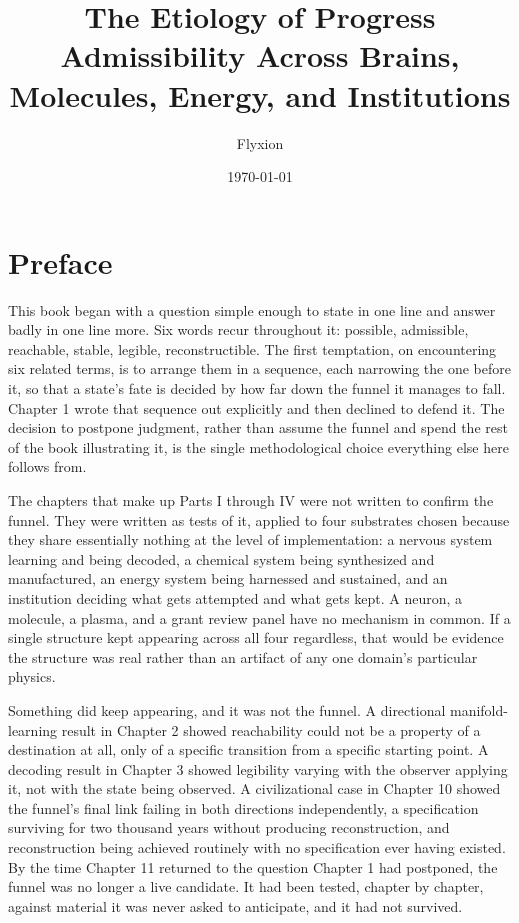 \documentclass[11pt]{book}
\title{The Etiology of Progress\\[0.3em]\large Admissibility Across Brains, Molecules, Energy, and Institutions}
\author{Flyxion}
\date{\today}
\begin{document}
\maketitle

\tableofcontents

\chapter*{Preface}

This book began with a question simple enough to state in one line and answer badly in one line more. Six words recur throughout it: possible, admissible, reachable, stable, legible, reconstructible. The first temptation, on encountering six related terms, is to arrange them in a sequence, each narrowing the one before it, so that a state's fate is decided by how far down the funnel it manages to fall. Chapter 1 wrote that sequence out explicitly and then declined to defend it. The decision to postpone judgment, rather than assume the funnel and spend the rest of the book illustrating it, is the single methodological choice everything else here follows from.

The chapters that make up Parts I through IV were not written to confirm the funnel. They were written as tests of it, applied to four substrates chosen because they share essentially nothing at the level of implementation: a nervous system learning and being decoded, a chemical system being synthesized and manufactured, an energy system being harnessed and sustained, and an institution deciding what gets attempted and what gets kept. A neuron, a molecule, a plasma, and a grant review panel have no mechanism in common. If a single structure kept appearing across all four regardless, that would be evidence the structure was real rather than an artifact of any one domain's particular physics.

Something did keep appearing, and it was not the funnel. A directional manifold-learning result in Chapter 2 showed reachability could not be a property of a destination at all, only of a specific transition from a specific starting point. A decoding result in Chapter 3 showed legibility varying with the observer applying it, not with the state being observed. A civilizational case in Chapter 10 showed the funnel's final link failing in both directions independently, a specification surviving for two thousand years without producing reconstruction, and reconstruction being achieved routinely with no specification ever having existed. By the time Chapter 11 returned to the question Chapter 1 had postponed, the funnel was no longer a live candidate. It had been tested, chapter by chapter, against material it was never asked to anticipate, and it had not survived.
\end{document}
